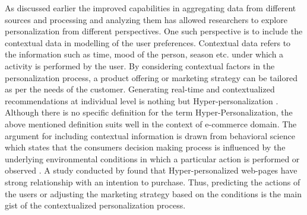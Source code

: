 As discussed earlier the improved capabilities in aggregating data from different sources and processing and analyzing them has allowed researchers to explore personalization from different perspectives. One such perspective is to include the contextual data in modelling of the user preferences. Contextual data refers to the information such as time, mood of the person, season etc. under which a activity is performed by the user. By considering contextual factors in the personalization process, a product offering or marketing strategy can be tailored as per the needs of the customer. Generating real-time and contextualized recommendations at individual level is nothing but Hyper-personalization \autocite[5]{CapgeminiconsultingESSECBusinessSchool2016}. Although there is no specific definition for the term Hyper-Personalization, the above mentioned definition suits well in the context of e-commerce domain. The argument for including contextual information is drawn from behavioral science which states that the consumers decision making process is influenced by the underlying environmental conditions in which a particular action is performed or observed \autocite[174]{foxall2001foundations}. A study conducted by \textcite[332]{Jain2018} found that Hyper-personalized web-pages have strong relationship with an intention to purchase.
Thus, predicting the actions of the users or adjusting the marketing strategy based on the conditions is the main gist of the contextualized personalization process. \\ 
\par
